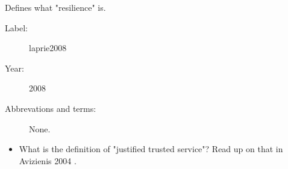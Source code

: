 Defines what "resilience" is.

\begin{description}
    \item[Label:] laprie2008 \cite{laprie2008}
    \item[Year:] 2008
    \item[Abbrevations and terms:] None.
\end{description}

\begin{itemize}
    \item What is the definition of "justified trusted service"? Read up on
        that in Avizienis 2004 \cite{avizienis2004}.
\end{itemize}

%
%
%
%
